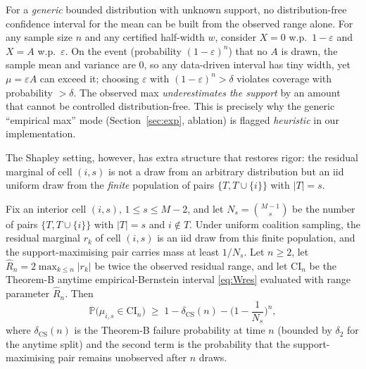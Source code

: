 \documentclass[11pt,twocolumn]{article}
\newcommand{\P}{\mathbb{P}}
\begin{document}
\begin{remark}
\label{rem:imposs}
For a \emph{generic} bounded distribution with unknown support, no
distribution-free confidence interval for the mean can be built from the
observed range alone.  For any sample size $n$ and any certified half-width
$w$, consider $X=0$ w.p.\ $1-\varepsilon$ and $X=A$ w.p.\ $\varepsilon$.  On
the event (probability $(1-\varepsilon)^n$) that no $A$ is drawn, the sample
mean and variance are $0$, so any data-driven interval has tiny width, yet
$\mu=\varepsilon A$ can exceed it; choosing $\varepsilon$ with
$(1-\varepsilon)^n>\delta$ violates coverage with probability $>\delta$.
The observed max \emph{underestimates the support} by an amount that cannot
be controlled distribution-free.  This is precisely why the generic
``empirical max'' mode (Section~\ref{sec:exp}, ablation) is flagged
\emph{heuristic} in our implementation.
\end{remark}

The Shapley setting, however, has extra structure that restores rigor: the
residual marginal of cell $(i,s)$ is not a draw from an arbitrary
distribution but an iid uniform draw from the \emph{finite} population of
pairs $\{T,T\cup\{i\}\}$ with $|T|=s$.

\begin{theorem}
\label{thm:E}
Fix an interior cell $(i,s)$, $1\le s\le M-2$, and let
$N_s=\binom{M-1}{s}$ be the number of pairs $\{T,T\cup\{i\}\}$ with
$|T|=s$ and $i\notin T$.  Under uniform coalition sampling, the residual
marginal $r_k$ of cell $(i,s)$ is an iid draw from this finite population,
and the support-maximising pair carries mass at least $1/N_s$.  Let
$n\ge2$, let $\hat R_n=2\max_{k\le n}|r_k|$ be twice the observed
residual range, and let $\mathrm{CI}_n$ be the Theorem-B anytime
empirical-Bernstein interval \eqref{eq:Wres} evaluated with range
parameter $\hat R_n$.  Then
\begin{equation}
\P\!\big(\mu_{i,s}\in\mathrm{CI}_n\big)\;\ge\;
1-\delta_{\mathrm{CS}}(n)-\Big(1-\frac1{N_s}\Big)^{n},
\label{eq:thmE}
\end{equation}
where $\delta_{\mathrm{CS}}(n)$ is the Theorem-B failure probability at
time $n$ (bounded by $\delta_2$ for the anytime split) and the second term
is the probability that the support-maximising pair remains unobserved
after $n$ draws.
\end{theorem}
\end{document}
